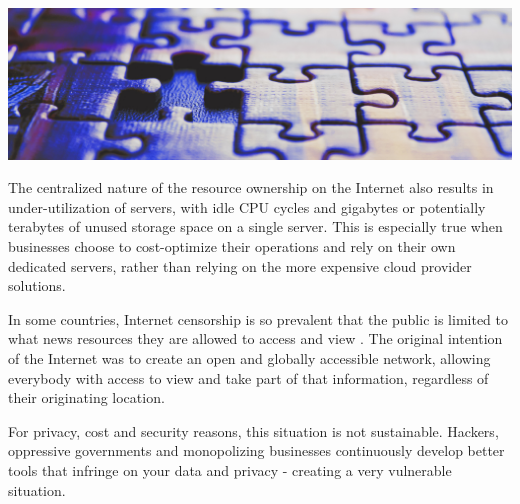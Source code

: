 \documentclass[a4paper,oneside]{article}
\begin{document}
\vspace{0.05cm}
\begin{mdframed}[style=textimage]
	\includegraphics[width=381pt]{puzzle}
\end{mdframed}

\noindent The centralized nature of the resource ownership on the Internet also results in under-utilization of servers, with idle CPU cycles and gigabytes or potentially terabytes of unused storage space on a single server. This is especially true when businesses choose to cost-optimize their operations and rely on their own dedicated servers, rather than relying on the more expensive cloud provider solutions.

In some countries, Internet censorship is so prevalent that the public is limited to what news resources they are allowed to access and view \cite{wiki2021}. The original intention of the Internet was to create an open and globally accessible network, allowing everybody with access to view and take part of that information, regardless of their originating location.

For privacy, cost and security reasons, this situation is not sustainable. Hackers, oppressive governments and monopolizing businesses continuously develop better tools that infringe on your data and privacy - creating a very vulnerable situation.
\end{document}
